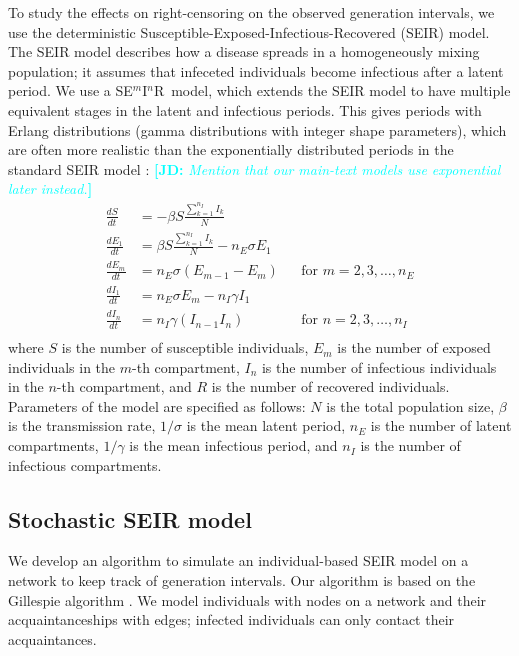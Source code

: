 \documentclass[12pt]{article}
\newcommand{\seminar}{SE\mbox{$^m$}I\mbox{$^n$}R}
\newcommand{\comment}[3]{\textcolor{#1}{\textbf{[#2: }\textsl{#3}\textbf{]}}}
\newcommand{\jd}[1]{\comment{cyan}{JD}{#1}}
\begin{document}
To study the effects on right-censoring on the observed generation intervals, we use the deterministic Susceptible-Exposed-Infectious-Recovered (SEIR) model.
The SEIR model describes how a disease spreads in a homogeneously mixing population; it assumes that infeceted individuals become infectious after a latent period.
We use a \seminar\ model, which extends the SEIR model to have multiple equivalent stages in the latent and infectious periods. This gives periods with Erlang distributions (gamma distributions with integer shape parameters), which are often more realistic than the exponentially distributed periods in the standard SEIR model \citep{anderson1980spread, bailey1964some}: 
\jd{Mention that our main-text models use exponential later instead.}
\begin{equation}
\begin{aligned}
\frac{dS}{dt} &= - \beta S \frac{\sum_{k=1}^{n_I} I_k}{N}\\
\frac{dE_1}{dt} &= \beta S \frac{\sum_{k=1}^{n_I} I_k}{N} - n_E \sigma E_1\\
\frac{dE_m}{dt} &= n_E \sigma (E_{m-1} - E_m) && \text{for } m = 2, 3, \dots, n_E\\
\frac{dI_1}{dt} &= n_E \sigma E_m - n_I \gamma I_1\\
\frac{dI_n}{dt} &= n_I \gamma (I_{n-1} I_n) && \text{for } n = 2, 3, \dots, n_I\\
\end{aligned}
\end{equation}
where $S$ is the number of susceptible individuals, $E_m$ is the number of exposed individuals in the $m$-th compartment, $I_n$ is the number of infectious individuals in the $n$-th compartment, and $R$ is the number of recovered individuals.
Parameters of the model are specified as follows: $N$ is the total population size, $\beta$ is the transmission rate, $1/\sigma$ is the mean latent period, $n_E$ is the number of latent compartments, $1/\gamma$ is the mean infectious period, and $n_I$ is the number of infectious compartments.

\subsection{Stochastic SEIR model}

We develop an algorithm to simulate an individual-based SEIR model on a network to keep track of generation intervals.
Our algorithm is based on the Gillespie algorithm \citep{gillespie1977exact}.
We model individuals with nodes on a network and their acquaintanceships with edges; infected individuals can only contact their acquaintances.
\end{document}
